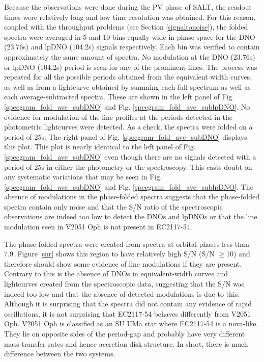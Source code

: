 Because the observations were done during the PV phase of SALT, the readout times were relatively long and low time resolution was obtained. For this reason, coupled with the throughput problems (see Section \ref{signaltonoise}), the folded spectra were averaged in 5 and 10 bins equally wide in phase space for the DNO (23.76s) and lpDNO (104.2s) signals respectively. Each bin was verified to contain approximately the same amount of spectra. No modulation at the DNO (23.76s) or lpDNO (104.2s) period is seen for any of the prominent lines. The process was repeated for all the possible periods obtained from the equivalent width curves, as well as from a lightcurve obtained by summing each full spectrum as well as each average-subtracted spectra. These are shown in the left panel of Fig. \ref{specgram_fold_ave_subDNO} and Fig. \ref{specgram_fold_ave_sublpDNO}. No evidence for modulation of the line profiles at the periods detected in the photometric lightcurves were detected. As a check, the spectra were folded on a period of 25s.  The right panel of Fig. \ref{specgram_fold_ave_subDNO} displays this plot. This plot is nearly identical to the left panel of Fig. \ref{specgram_fold_ave_subDNO} even though there are no signals detected with a period of 25s in either the photometry or the spectroscopy. This casts doubt on any systematic variations that may be seen in Fig. \ref{specgram_fold_ave_subDNO} and Fig. \ref{specgram_fold_ave_sublpDNO}. The absence of modulations in the phase-folded spectra suggests that the phase-folded spectra contain only noise and that the S/N ratio of the spectroscopic observations are indeed too low to detect the DNOs and lpDNOs or that the line modulation seen in V2051 Oph \citep{V2051Oph2001} is not present in EC2117-54.

The phase folded spectra were created from spectra at orbital phases less than 7.9. Figure \ref{snr} shows this region to have relatively high S/N (S/N $\geq$10) and therefore should show some evidence of line modulations if they are present. Contrary to this is the absence of DNOs in equivalent-width curves and lightcurves created from the spectroscopic data, suggesting that the S/N was indeed too low and that the absence of detected modulations is due to this. Although it is surprising that the spectra did not contain any evidence of rapid oscillations, it is not surprising that EC2117-54 behaves differently from V2051 Oph. V2051 Oph is classified as an SU UMa star where EC2117-54 is a nova-like. They lie on opposite sides of the period-gap and probably have very different mass-transfer rates and hence accretion disk structure. In short, there is much difference between the two systems.

